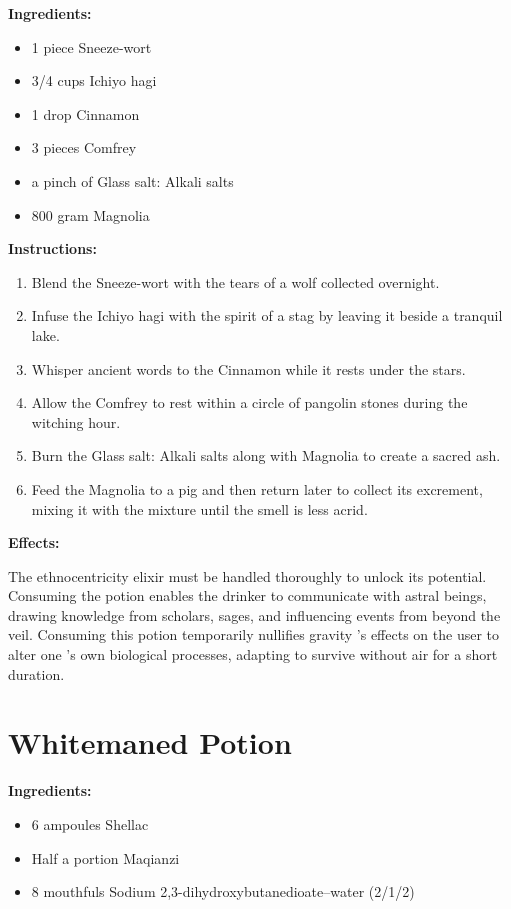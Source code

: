 \documentclass{article}
\begin{document}
\textbf{Ingredients:}

\begin{itemize}
  \item 1 piece Sneeze-wort
  \item 3/4 cups Ichiyo hagi
  \item 1 drop Cinnamon
  \item 3 pieces Comfrey
  \item a pinch of Glass salt: Alkali salts
  \item 800 gram Magnolia
\end{itemize}

\textbf{Instructions:}

\begin{enumerate}
  \item Blend the Sneeze-wort with the tears of a wolf collected overnight.
  \item Infuse the Ichiyo hagi with the spirit of a stag by leaving it beside a tranquil lake.
  \item Whisper ancient words to the Cinnamon while it rests under the stars.
  \item Allow the Comfrey to rest within a circle of pangolin stones during the witching hour.
  \item Burn the Glass salt: Alkali salts along with Magnolia to create a sacred ash.
  \item Feed the Magnolia to a pig and then return later to collect its excrement, mixing it with the mixture until the smell is less acrid.
\end{enumerate}

\textbf{Effects:}

The ethnocentricity elixir must be handled thoroughly to unlock its potential. Consuming the potion enables the drinker to communicate with astral beings, drawing knowledge from scholars, sages, and influencing events from beyond the veil. Consuming this potion temporarily nullifies gravity 's effects on the user to alter one 's own biological processes, adapting to survive without air for a short duration.

\newpage
\section*{Whitemaned Potion}

\textbf{Ingredients:}

\begin{itemize}
  \item 6 ampoules Shellac
  \item Half a portion Maqianzi
  \item 8 mouthfuls Sodium 2,3-dihydroxybutanedioate--water (2/1/2)
\end{itemize}
\end{document}
